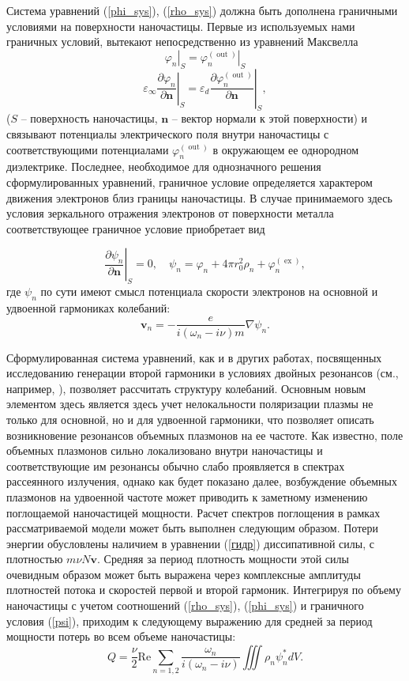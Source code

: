 \documentclass[12pt, a4paper]{article}
\renewcommand{\vec}{\mathbf}
\def \eps {\varepsilon}
\def \w {\omega}
\def \ph {\varphi}
\def \ex { \operatorname{ex}}
\def \out { \operatorname{out}}
\newcommand{\dn}[1]{\left.\frac{\partial #1}{\partial \vec{n}}\right|_{ S}}
\begin{document}
Система уравнений (\ref{phi_sys}), (\ref{rho_sys}) должна быть дополнена граничными условиями на поверхности наночастицы. Первые из используемых нами граничных условий, вытекают непосредственно из уравнений Максвелла
\begin{equation} 
	\label{g_u1}
	\left. \ph_n \right|_{ S} = \left. \ph_n^{(\out)} \right|_{ S} 
\end{equation}
\begin{equation} 
	\label{g_u2}
	\eps_\infty \dn{\ph_n} = \eps_d \dn{\ph_n^{(\out)}},
\end{equation}
($S$ -- поверхность наночастицы, $\vec{n}$ -- вектор нормали к этой поверхности) и связывают потенциалы электрического поля внутри наночастицы с соответствующими потенциалами $\ph_{n}^{(\out)}$ в окружающем ее однородном диэлектрике.
Последнее, необходимое для однозначного решения сформулированных уравнений, граничное условие определяется характером движения электронов близ границы наночастицы. В случае принимаемого здесь условия зеркального отражения электронов от поверхности металла соответствующее граничное условие приобретает вид

\begin{equation} 
	\label{psi}
\dn{\psi_n}	= 0, \quad \psi_n = \ph_n + 4 \pi r_0^2 \rho_n + \ph^{(\ex)}_n, 
\end{equation}
где $\psi_{n}$ по сути имеют смысл потенциала скорости электронов на основной и удвоенной гармониках колебаний:
\begin{equation} 
	\label{v}
	\vec{v}_n = -\frac{e}{i(\w_n - i\nu)m} \nabla \psi_n.
\end{equation}

Сформулированная система уравнений, как и в других работах, посвященных исследованию генерации второй гармоники в условиях двойных резонансов (см., например, \cite{Ai2021, HuaGersten1986, Panoiu2018, Beer2022}), позволяет рассчитать структуру колебаний. Основным новым элементом здесь является здесь учет нелокальности поляризации плазмы не только для основной, но и для удвоенной гармоники, что позволяет описать возникновение резонансов объемных плазмонов на ее частоте. Как известно, поле объемных плазмонов сильно локализовано внутри наночастицы и соответствующие им резонансы обычно слабо проявляется в спектрах рассеянного излучения, однако как будет показано далее, возбуждение объемных плазмонов на удвоенной частоте может приводить к заметному изменению поглощаемой наночастицей мощности. Расчет спектров поглощения в рамках рассматриваемой модели может быть выполнен следующим образом. Потери энергии обусловлены наличием в уравнении (\ref{гидр}) диссипативной силы, с плотностью $m \nu N \vec{v}$. Средняя за период плотность мощности этой силы очевидным образом может быть выражена через комплексные амплитуды плотностей потока и скоростей первой и второй гармоник. Интегрируя по объему наночастицы с учетом соотношений (\ref{rho_sys}), (\ref{phi_sys}) и граничного условия (\ref{psi}), приходим к следующему выражению для средней за период мощности потерь во всем объеме наночастицы: 
\begin{equation} 
	\label{Q}
	Q = \frac{\nu}{2}\mathrm{Re}  \sum_{n=1,2}\frac{\w_n}{i(\w_n - i \nu)}\iiint\rho_n \psi_n^* dV.
\end{equation}
\end{document}
